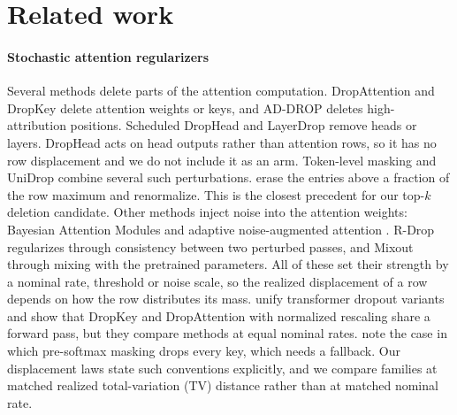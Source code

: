 \section{Related work}\label{sec:related}

\paragraph{Stochastic attention regularizers}
Several methods delete parts of the attention computation. DropAttention \citep{lin2019dropattention} and
DropKey \citep{li2023dropkey} delete attention weights or keys, and AD-DROP \citep{yang2022addrop} deletes
high-attribution positions. Scheduled DropHead \citep{zhou2020drophead} and LayerDrop \citep{fan2020reducing}
remove heads or layers. DropHead acts on head outputs rather than attention rows, so it has no row
displacement and we do not include it as an arm. Token-level masking \citep{wu2023tlm} and UniDrop
\citep{wu2021unidrop} combine several such perturbations. \citet{luo2021dropout} erase the
entries above a fraction of the row maximum and renormalize. This is the closest precedent for our top-$k$
deletion candidate.
Other methods inject noise into the attention weights: Bayesian Attention Modules \citep{fan2020bam} and
adaptive noise-augmented attention \citep{amirahmadi2025anaa}. R-Drop \citep{liang2021rdrop} regularizes
through consistency between two perturbed passes, and Mixout \citep{lee2020mixout} through mixing with the
pretrained parameters. All of these set their strength by a nominal rate, threshold or noise scale, so
the realized displacement of a row depends on how the row distributes its mass. \citet{wang2024loradropout} unify transformer dropout variants and show that DropKey and DropAttention
with normalized rescaling share a forward pass, but they compare methods at equal nominal rates.
\citet{wu2021notall} note the case in which pre-softmax masking drops every key, which needs a
fallback. Our displacement laws state such conventions explicitly, and we compare families at matched
realized total-variation (TV) distance rather than at matched nominal rate.

